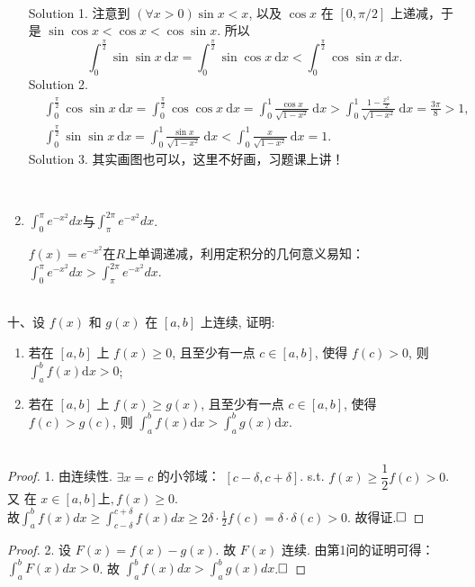\documentclass[lang=cn,newtx,10pt,scheme=chinese]{elegantbook}
\begin{document}
\begin{enumerate}
\begin{solution}\\
{\color{blue}Solution 1.}
	注意到 $(\forall x>0) \sin x<x$, 以及 $\cos x$ 在 $[0, \pi / 2]$ 上递减，于是 $\sin \cos x<\cos x<\cos \sin x$. 所以
	$$
	\int_0^{\frac{\pi}{2}} \sin \sin x \mathrm{~d} x=\int_0^{\frac{\pi}{2}} \sin \cos x \mathrm{~d} x<\int_0^{\frac{\pi}{2}} \cos \sin x \mathrm{~d} x.
	$$
	{\color{blue}Solution 2.}
	$$
	\begin{aligned}
		& \int_0^{\frac{\pi}{2}} \cos \sin x \mathrm{~d} x=\int_0^{\frac{\pi}{2}} \cos \cos x \mathrm{~d} x=\int_0^1 \frac{\cos x}{\sqrt{1-x^2}} \mathrm{~d} x>\int_0^1 \frac{1-\frac{x^2}{2}}{\sqrt{1-x^2}} \mathrm{~d} x=\frac{3 \pi}{8}>1, \\
		& \int_0^{\frac{\pi}{2}} \sin \sin x \mathrm{~d} x=\int_0^1 \frac{\sin x}{\sqrt{1-x^2}} \mathrm{~d} x<\int_0^1 \frac{x}{\sqrt{1-x^2}} \mathrm{~d} x=1.
	\end{aligned}
	$$
		{\color{blue}Solution 3.} 其实画图也可以，这里不好画，习题课上讲！
\end{solution}
~\\
\item $\displaystyle\int_{0}^{\pi}e^{-x^2} dx$与$\displaystyle\int_{\pi}^{2\pi}e^{-x^2}dx  $.
\begin{solution}
	$f(x)=e^{-x^2}$在$R$上单调递减，利用定积分的几何意义易知：$\displaystyle\int_{0}^{\pi}e^{-x^2} dx>\displaystyle\int_{\pi}^{2\pi}e^{-x^2}dx.$
\end{solution}
\end{enumerate}

~\\
十、设 $f(x)$ 和 $g(x)$ 在 $[a, b]$ 上连续, 证明:
\begin{enumerate}
\item 若在 $[a, b]$ 上 $f(x) \geqslant 0$, 且至少有一点 $c \in[a, b]$, 使得 $f(c)>0$, 则 $\displaystyle\int_a^b f(x) \mathrm{d} x>0$; \\
\item 若在 $[a, b]$ 上 $f(x) \geqslant g(x)$, 且至少有一点 $c \in[a, b]$, 使得 $f(c)>g(c)$, 则 $\displaystyle\int_a^b f(x) \mathrm{d} x>\int_a^b g(x) \mathrm{d} x$.\\
	~\\
\end{enumerate}
\begin{proof}
	1. 由连续性. $\exists x=c$ 的小邻域： $[c-\delta, c+\delta]$. s.t. $f(x) \geqslant \dfrac{1}{2} f(c)>0$. 又 在 $x \in[a, b] $上$, f(x) \geqslant 0$.\\
	
	\qquad 故$\displaystyle\int_a^b f(x) d x \geqslant \int_{c-\delta}^{c+\delta} f(x) d x \geqslant 2 \delta \cdot \frac{1}{2} f(c)=\delta \cdot \delta(c)>0$. 故得证.$\hfill\square$
\end{proof}
\begin{proof}2.
	设 $F(x)=f(x)-g(x)$. 故 $F(x)$ 连续. 由第1问的证明可得：$\displaystyle\int_a^b F(x) d x>0$. 故
	$\displaystyle\int_a^b f(x) d x>\int_a^b g(x) d x$.$\hfill\square$
\end{proof}
\end{document}
